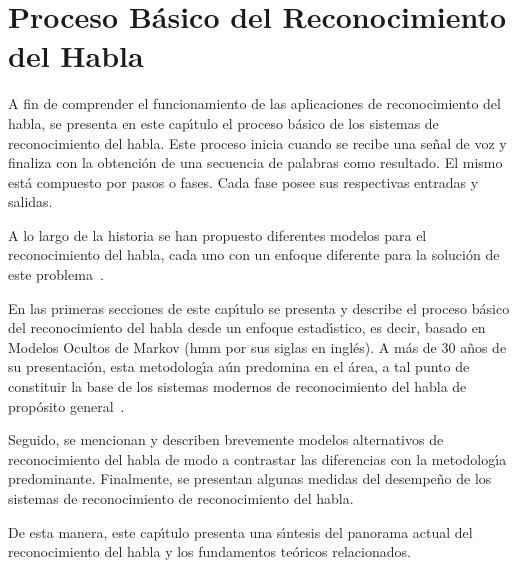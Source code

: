 \chapter{Proceso B\'{a}sico del Reconocimiento del Habla}
\label{sec:proceso}

A fin de comprender el funcionamiento de las aplicaciones de reconocimiento del habla, 
se presenta en este cap{\'\i}tulo el proceso b\'asico de los sistemas de reconocimiento del habla.
Este proceso inicia cuando se recibe una se\~nal de voz y finaliza con la obtenci\'on de una secuencia
de palabras como resultado. El mismo est\'a compuesto por pasos o fases. Cada fase posee sus 
respectivas entradas y salidas.

A lo largo de la historia se han propuesto diferentes modelos para el reconocimiento del habla, cada uno
con un enfoque diferente para la soluci\'on de este \mbox{problema \cite{VimalaReview2012}}. 

En las primeras secciones de este cap{\'\i}tulo se presenta y describe el proceso b\'asico del 
reconocimiento del habla desde un enfoque estad{\'\i}stico, es decir, basado en Modelos Ocultos de 
Markov (\gls{hmm} por sus siglas en ingl\'es). 
A m\'as de 30 a\~nos de su presentaci\'on, esta metodolog{\'\i}a a\'un predomina en el \'area,
a tal punto de constituir la base de los sistemas modernos de reconocimiento del habla de 
prop\'osito \mbox{general \cite{BakerResearch2009, VimalaReview2012}}.

Seguido, se mencionan y describen brevemente modelos alternativos de reconocimiento del habla de modo 
a contrastar las diferencias con la metodolog{\'\i}a predominante. Finalmente, se presentan algunas medidas del 
desempe\~no de los sistemas de reconocimiento de reconocimiento del habla.

De esta manera, este cap{\'\i}tulo presenta una s{\'\i}ntesis del panorama actual del reconocimiento del habla y
los fundamentos te\'oricos relacionados.






